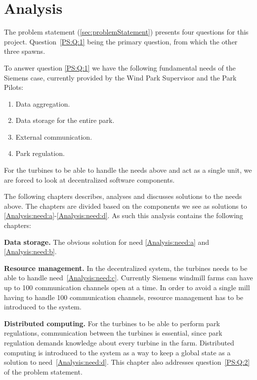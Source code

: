 \chapter{Analysis}

The problem statement (\cref{sec:problemStatement}) presents four questions for this project. Question~\ref{PS:Q:1} being the primary question, from which the other three spawns. 

To answer question \ref{PS:Q:1} we have the following fundamental needs of the Siemens case, currently provided by the Wind Park Supervisor and the Park Pilots:
\begin{enumerate}[label=\textbf{\alph*.}, ref=\textit{\alph*}]
\item \label{Analysis:need:a} Data aggregation.
\item \label{Analysis:need:b} Data storage for the entire park.
\item \label{Analysis:need:c} External communication.
\item \label{Analysis:need:d} Park regulation.
\end{enumerate}

For the turbines to be able to handle the needs above and act as a single unit, we are forced to look at decentralized software components. 

The following chapters describes, analyses and discusses solutions to the needs above. The chapters are divided based on the components we see as solutions to \ref{Analysis:need:a}-\ref{Analysis:need:d}. As such this analysis contains the following chapters:

\begin{description}
\item{\textbf{Data storage.}} The obvious solution for need \ref{Analysis:need:a} and \ref{Analysis:need:b}.
\item{\textbf{Resource management.}} In the decentralized system, the turbines needs to be able to handle need~\ref{Analysis:need:c}. Currently Siemens windmill farms can have up to 100 communication channels open at a time. In order to avoid a single mill having to handle 100 communication channels, resource management has to be introduced to the system.
\item{\textbf{Distributed computing.}} For the turbines to be able to perform park regulations, communication between the turbines is essential, since park regulation demands knowledge about every turbine in the farm. Distributed computing is introduced to the system as a way to keep a global state as a solution to need~\ref{Analysis:need:d}. This chapter also addresses question~\ref{PS:Q:2} of the problem statement.
\end{description}

